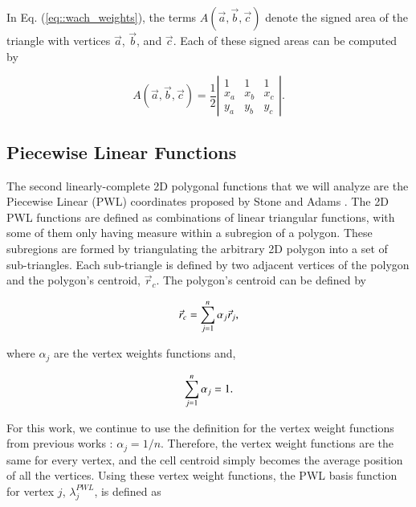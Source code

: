 \documentclass[preprint,10pt]{elsarticle}
\begin{document}
\noindent In Eq. (\ref{eq::wach_weights}), the terms $A(\vec{a}, \vec{b}, \vec{c})$ denote the signed area of the triangle with vertices $\vec{a}$, $\vec{b}$, and $\vec{c}$. Each of these signed areas can be computed by

\begin{equation}
\label{eq::wach_signed_area}
A(\vec{a}, \vec{b}, \vec{c}) = \frac{1}{2}
\left|  
  \begin{array}{ccc}
  1 & 1 & 1 \\
  x_a & x_b & x_c \\
  y_a & y_b & y_c
  \end{array}
\right| .
\end{equation}

\subsection{Piecewise Linear Functions}

The second linearly-complete 2D polygonal functions that we will analyze are the Piecewise Linear (PWL) coordinates proposed by Stone and Adams \cite{ref::PWLD_stone_adams,ref::PWLD_stone_adams_unstructured}. The 2D PWL functions are defined as combinations of linear triangular functions, with some of them only having measure within a subregion of a polygon. These subregions are formed by triangulating the arbitrary 2D polygon into a set of sub-triangles.  Each sub-triangle is defined by two adjacent vertices of the polygon and the polygon's centroid, $\vec{r}_{c}$. The polygon's centroid can be defined by

\begin{equation}
\label{eq::PWL_2D_centroid}
	\vec{r}_{c} =  \sum\displaylimits_{j=1}^{n} \alpha_{j} \vec{r}_j ,
\end{equation}

\noindent where $\alpha_{j}$ are the vertex weights functions and, 

\begin{equation}
\label{eq::PWL_2D_vertex_weight_sum}
 \sum\displaylimits_{j=1}^{n} \alpha_{j} = 1.
\end{equation}

\noindent For this work, we continue to use the definition for the vertex weight functions from previous works \cite{ref::PWLD_stone_adams,ref::PWLD_stone_adams_unstructured,bailey2008phd}: $\alpha_{j}= 1/n$. Therefore, the vertex weight functions are the same for every vertex, and the cell centroid simply becomes the average position of all the vertices. Using these vertex weight functions, the PWL basis function for vertex $j$, $\lambda_j^{PWL}$, is defined as
\end{document}
